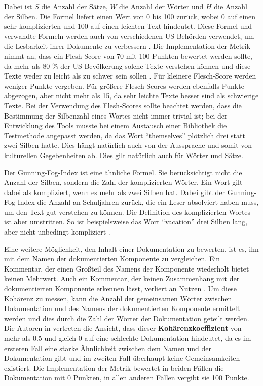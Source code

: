 Dabei ist $S$ die Anzahl der Sätze, $W$ die Anzahl der Wörter und $H$ die Anzahl der Silben. Die Formel liefert einen Wert von 0 bis 100 zurück, wobei 0 auf einen sehr komplizierten und 100 auf einen leichten Text hindeutet. Diese Formel und verwandte Formeln werden auch von verschiedenen US-Behörden verwendet, um die Lesbarkeit ihrer Dokumente zu verbessern \cite[S. 72]{AutomaticQualityAssessmentofSourceCodeComments:TheJavadocMiner}. Die Implementation der Metrik nimmt an, dass ein Flesh-Score von 70 mit 100 Punkten bewertet werden sollte, da mehr als 80 \% der US-Bevölkerung solche Texte verstehen können und diese Texte weder zu leicht als zu schwer sein sollen \cite[S. 22]{ThePrinciplesofReadability}. Für kleinere Flesch-Score werden weniger Punkte vergeben. Für größere Flesch-Scores werden ebenfalls Punkte abgezogen, aber nicht mehr als 15, da sehr leichte Texte besser sind als schwierige Texte. 
Bei der Verwendung des Flesh-Scores sollte beachtet werden, dass die Bestimmung der Silbenzahl eines Wortes nicht immer trivial ist; bei der Entwicklung des Tools musste bei einem Austausch einer Bibliothek die Testmethode angepasst werden, da das Wort \enquote{themselves} plötzlich drei statt zwei Silben hatte. Dies hängt natürlich auch von der Aussprache und somit von kulturellen Gegebenheiten ab. Dies gilt natürlich auch für Wörter und Sätze. 

Der Gunning-Fog-Index ist eine ähnliche Formel. Sie berücksichtigt nicht die Anzahl der Silben, sondern die Zahl der komplizierten Wörter. Ein Wort gilt dabei als kompliziert, wenn es mehr als zwei Silben hat. Dabei gibt der Gunning-Fog-Index die Anzahl an Schuljahren zurück, die ein Leser absolviert haben muss, um den Text gut verstehen zu können. Die Definition des komplizierten Wortes ist aber umstritten. So ist beispielsweise das Wort \enquote{vacation} drei Silben lang, aber nicht unbedingt kompliziert \cite[S. 10]{bogert1985defense}.

\bigskip
Eine weitere Möglichkeit, den Inhalt einer Dokumentation zu bewerten, ist es, ihn mit dem Namen der dokumentierten Komponente zu vergleichen. Ein Kommentar, der einen Großteil des Namens der Komponente wiederholt bietet keinen Mehrwert. Auch ein Kommentar, der keinen Zusammenhang mit der dokumentierten Komponente erkennen lässt, verliert an Nutzen \cite[S. 86]{Qualityanalysisofsourcecodecomments}.
Um diese Kohärenz zu messen, kann die Anzahl der gemeinsamen Wörter zwischen Dokumentation und des Namens der dokumentierten Komponente ermittelt werden und dies durch die Zahl der Wörter der Dokumentation geteilt werden. Die Autoren in \cite[S. 87]{Qualityanalysisofsourcecodecomments} vertreten die Ansicht, dass dieser \textbf{Kohärenzkoeffizient} von mehr als 0.5 und gleich 0 auf eine schlechte Dokumentation hindeutet, da es im ersteren Fall eine starke Ähnlichkeit zwischen dem Namen und der Dokumentation gibt und im zweiten Fall überhaupt keine Gemeinsamkeiten existiert. Die Implementation der Metrik bewertet in beiden Fällen die Dokumentation mit 0 Punkten, in allen anderen Fällen vergibt sie 100 Punkte.

